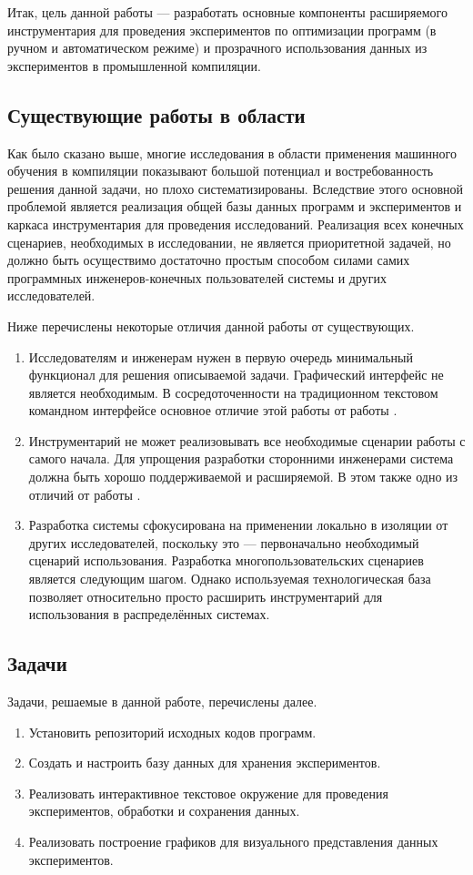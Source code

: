 Итак, цель данной работы --- разработать основные компоненты расширяемого инструментария для проведения экспериментов по оптимизации программ (в ручном и автоматическом режиме) и прозрачного использования данных из экспериментов в промышленной компиляции.

\subsection{Существующие работы в области}
Как было сказано выше, многие исследования в области применения машинного обучения в компиляции \cite{Dubach2009PCO,Thomson2009RTT,Stephenson2003MOI} показывают большой потенциал и востребованность решения данной задачи, но плохо систематизированы. Вследствие этого основной проблемой является реализация общей базы данных программ и экспериментов и каркаса инструментария для проведения исследований. Реализация всех конечных сценариев, необходимых в исследовании, не является приоритетной задачей, но должно быть осуществимо достаточно простым способом силами самих программных инженеров-конечных пользователей системы и других исследователей.

Ниже перечислены некоторые отличия данной работы от существующих.
\begin{enumerate}
    \item Исследователям и инженерам нужен в первую очередь минимальный функционал для решения описываемой задачи. Графический интерфейс не является необходимым. В сосредоточенности на традиционном текстовом командном интерфейсе основное отличие этой работы от работы \cite{Fursin2010COP}.
    \item Инструментарий не может реализовывать все необходимые сценарии работы с самого начала. Для упрощения разработки сторонними инженерами система должна быть хорошо поддерживаемой и расширяемой. В этом также одно из отличий от работы \cite{Fursin2010COP}.
    \item Разработка системы сфокусирована на применении локально в изоляции от других исследователей, поскольку это --- первоначально необходимый сценарий использования. Разработка многопользовательских сценариев является следующим шагом. Однако используемая технологическая база позволяет относительно просто расширить инструментарий для использования в распределённых системах.
\end{enumerate}

\subsection{Задачи}
Задачи, решаемые в данной работе, перечислены далее.
\begin{enumerate}
    \item Установить репозиторий исходных кодов программ.
    \item Создать и настроить базу данных для хранения экспериментов.
    \item Реализовать интерактивное текстовое окружение для проведения экспериментов, обработки и сохранения данных.
    \item Реализовать построение графиков для визуального представления данных экспериментов.
\end{enumerate}